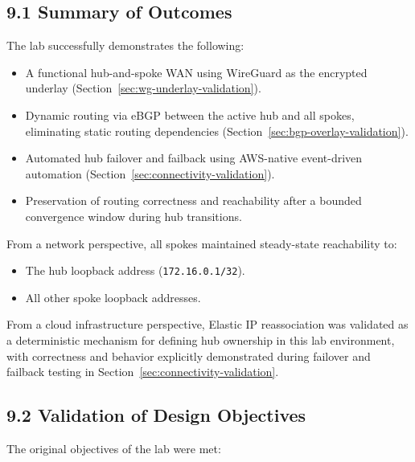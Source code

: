 \documentclass[11pt]{article}
\begin{document}
\subsection{9.1 Summary of Outcomes}
\label{sec:conclusion-summary-outcomes}

The lab successfully demonstrates the following:

\begin{itemize}
  \item A functional hub-and-spoke WAN using WireGuard as the encrypted underlay (Section~\ref{sec:wg-underlay-validation}).
  \item Dynamic routing via eBGP between the active hub and all spokes, eliminating static routing dependencies (Section~\ref{sec:bgp-overlay-validation}).
  \item Automated hub failover and failback using AWS-native event-driven automation (Section~\ref{sec:connectivity-validation}).
  \item Preservation of routing correctness and reachability after a bounded convergence window during hub transitions.
\end{itemize}

From a network perspective, all spokes maintained steady-state reachability to:
\begin{itemize}
  \item The hub loopback address (\texttt{172.16.0.1/32}).
  \item All other spoke loopback addresses.
\end{itemize}

From a cloud infrastructure perspective, Elastic IP reassociation was validated as a deterministic mechanism for defining hub ownership in this lab environment, with correctness and behavior explicitly demonstrated during failover and failback testing in Section~\ref{sec:connectivity-validation}.

\subsection{9.2 Validation of Design Objectives}
\label{sec:conclusion-objectives}

The original objectives of the lab were met:
\end{document}
